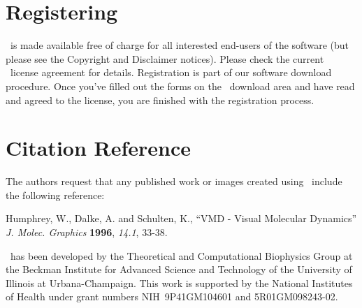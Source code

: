 
%
%
%

\section{Registering \VMD}

\VMD\ is made available free of charge for all interested 
end-users of the software (but please see the Copyright and 
Disclaimer notices).  Please check the current \VMD\ license 
agreement for details.  Registration is part of our software download
procedure.  Once you've filled out the forms on the \VMD\ download
area and have read and agreed to the license, you are finished with
the registration process.

\section{Citation Reference}
The authors request that any published work or images created using \VMD\ 
include the following reference:

\begin{description}
  \item{Humphrey, W., Dalke, A. and Schulten, K.,} ``VMD - Visual Molecular
Dynamics'' {\em J. Molec. Graphics} {\bf 1996}, {\em 14.1}, 33-38.
\end{description}

\VMD\ has been developed by the 
Theoretical and Computational Biophysics Group at the
Beckman Institute for Advanced Science and Technology of the
University of Illinois at Urbana-Champaign.
This work is supported by the National Institutes of Health under
grant numbers NIH~9P41GM104601 and 5R01GM098243-02.

